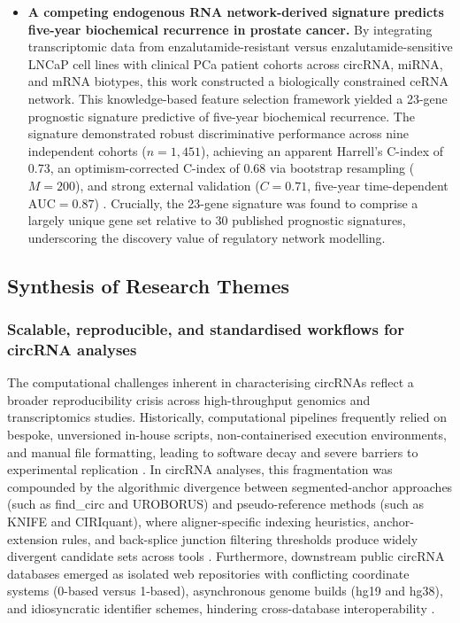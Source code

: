 \begin{itemize}
    \item \textbf{A competing endogenous RNA network-derived signature predicts five-year biochemical recurrence in prostate cancer.} By integrating transcriptomic data from enzalutamide-resistant versus enzalutamide-sensitive LNCaP cell lines with clinical PCa patient cohorts across circRNA, miRNA, and mRNA biotypes, this work constructed a biologically constrained ceRNA network. This knowledge-based feature selection framework yielded a 23-gene prognostic signature predictive of five-year biochemical recurrence. The signature demonstrated robust discriminative performance across nine independent cohorts ($n=1{,}451$), achieving an apparent Harrell's C-index of 0.73, an optimism-corrected C-index of 0.68 via bootstrap resampling ($M=200$), and strong external validation ($C = 0.71$, five-year time-dependent $\text{AUC} = 0.87$) \cite{Mortensen2015Nov, Harrell1996Feb, Steyerberg2015Apr}. Crucially, the 23-gene signature was found to comprise a largely unique gene set relative to 30 published prognostic signatures, underscoring the discovery value of regulatory network modelling.
\end{itemize}

\subsection{Synthesis of Research Themes}

\subsubsection{Scalable, reproducible, and standardised workflows for circRNA analyses}
The computational challenges inherent in characterising circRNAs reflect a broader reproducibility crisis across high-throughput genomics and transcriptomics studies. Historically, computational pipelines frequently relied on bespoke, unversioned in-house scripts, non-containerised execution environments, and manual file formatting, leading to software decay and severe barriers to experimental replication \cite{Ziemann2023Oct}. In circRNA analyses, this fragmentation was compounded by the algorithmic divergence between segmented-anchor approaches (such as find\_circ and UROBORUS) and pseudo-reference methods (such as KNIFE and CIRIquant), where aligner-specific indexing heuristics, anchor-extension rules, and back-splice junction filtering thresholds produce widely divergent candidate sets across tools \cite{findcirc, UROBORUS, KNIFE, CIRIquant, Hansen2016Apr, Zeng2017Jun, Vromman2023Aug}. Furthermore, downstream public circRNA databases emerged as isolated web repositories with conflicting coordinate systems (0-based versus 1-based), asynchronous genome builds (hg19 and hg38), and idiosyncratic identifier schemes, hindering cross-database interoperability \cite{Chen2023Jan}.

